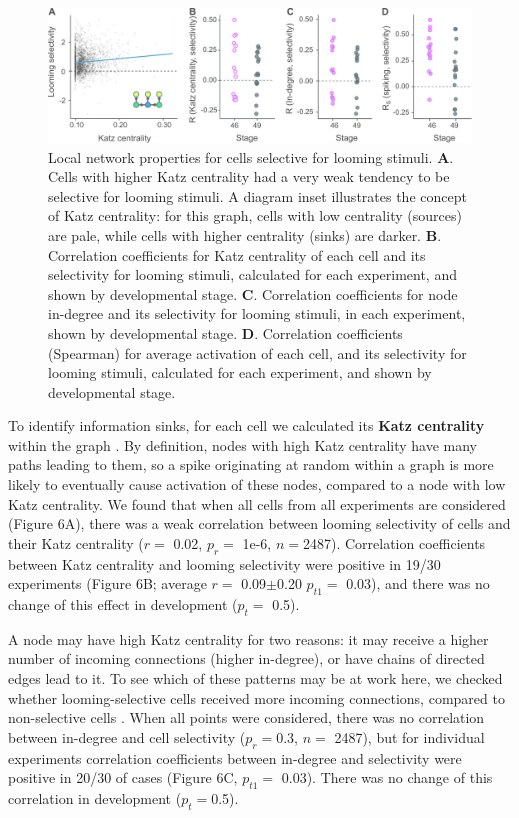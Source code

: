 \documentclass{article}
\begin{document}
\begin{figure}[t!]
\includegraphics[width=\linewidth]{fig6.pdf}
\caption{
Local network properties for cells selective for looming stimuli. \textbf{A}. Cells with higher Katz centrality had a very weak tendency to be selective for looming stimuli. A diagram inset illustrates the concept of Katz centrality: for this graph, cells with low centrality (sources) are pale, while cells with higher centrality (sinks) are darker. \textbf{B}. Correlation coefficients for Katz centrality of each cell and its selectivity for looming stimuli, calculated for each experiment, and shown by developmental stage. \textbf{C}. Correlation coefficients for node in-degree and its selectivity for looming stimuli, in each experiment, shown by developmental stage. \textbf{D}. Correlation coefficients (Spearman) for average activation of each cell, and its selectivity for looming stimuli, calculated for each experiment, and shown by developmental stage. }
\end{figure}

To identify information sinks, for each cell we calculated its \textbf{Katz centrality} within the graph \citep{katz1953original,fletcher2018katz}. By definition, nodes with high Katz centrality have many paths leading to them, so a spike originating at random within a graph is more likely to eventually cause activation of these nodes, compared to a node with low Katz centrality. We found that when all cells from all experiments are considered (Figure 6A), there was a weak correlation between looming selectivity of cells and their Katz centrality ($r =$ 0.02, $p_{r} =$ 1e-6, $n=$2487). Correlation coefficients between Katz centrality and looming selectivity were positive in 19/30 experiments (Figure 6B; average $r=$ 0.09$\pm$0.20 $p_{t1}=$ 0.03), and there was no change of this effect in development ($p_t=$ 0.5).

A node may have high Katz centrality for two reasons: it may receive a higher number of incoming connections (higher in-degree), or have chains of directed edges lead to it. To see which of these patterns may be at work here, we checked whether looming-selective cells received more incoming connections, compared to non-selective cells \citep{litwin2014assemblies}. When all points were considered, there was no correlation between in-degree and cell selectivity ($p_{r}=$0.3, $n=$ 2487), but for individual experiments correlation coefficients between in-degree and selectivity were positive in 20/30 of cases (Figure 6C, $p_{t1}=$ 0.03). There was no change of this correlation in development ($p_t=$0.5).
\end{document}
